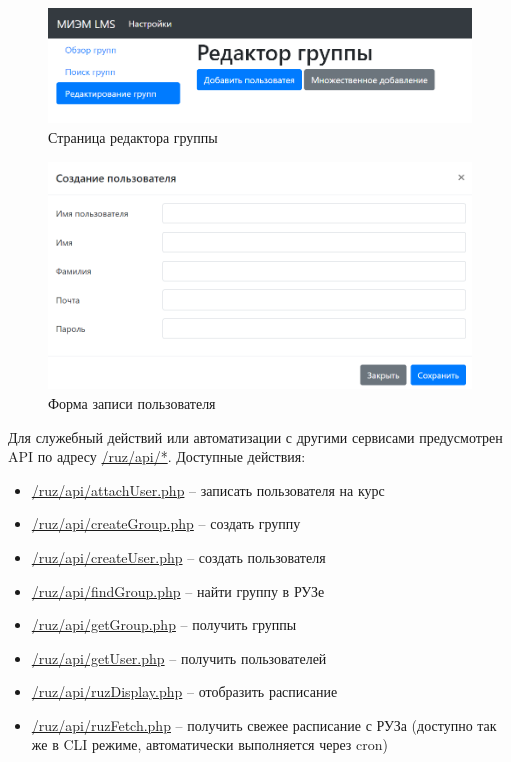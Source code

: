 \documentclass[a4paper,14pt]{article}
\begin{document}
\begin{figure}[H]
	\centering
	\includegraphics[width=\linewidth]{image/ui_groupEditor}
	\caption{Страница редактора группы }
	\label{img:ui_groupEditor}
\end{figure}
\begin{figure}[H]
	\centering
	\includegraphics[width=\linewidth]{image/ui_newUser}
	\caption{Форма записи пользователя}
	\label{img:ui_newUser}
\end{figure}

Для служебный действий или автоматизации с другими сервисами предусмотрен API по адресу \url{/ruz/api/*}.
Доступные действия:
\begin{itemize}
	\item \url{/ruz/api/attachUser.php} -- записать пользователя на курс
	\item \url{/ruz/api/createGroup.php} -- создать группу
	\item \url{/ruz/api/createUser.php} -- создать пользователя
	\item \url{/ruz/api/findGroup.php} -- найти группу в РУЗе
	\item \url{/ruz/api/getGroup.php} -- получить группы
	\item \url{/ruz/api/getUser.php} -- получить пользователей
	\item \url{/ruz/api/ruzDisplay.php} -- отобразить расписание 
	\item \url{/ruz/api/ruzFetch.php} -- получить свежее расписание с РУЗа (доступно так же в CLI режиме, автоматически выполняется через cron)
\end{itemize}
\end{document}
